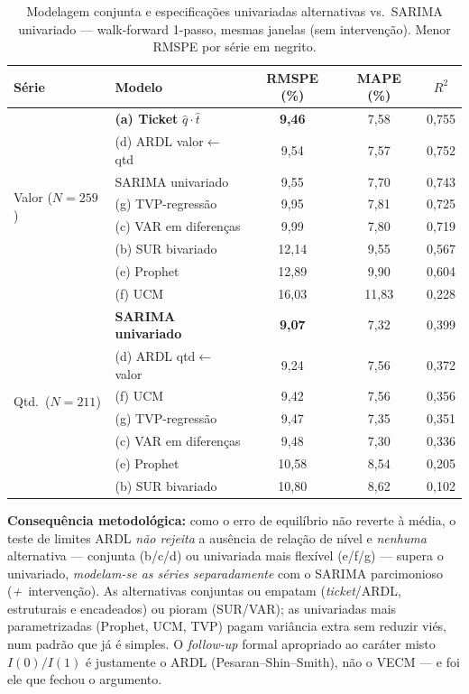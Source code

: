 \documentclass[11pt,a4paper]{article}
\begin{document}
\begin{table}[H]
\centering
\caption{Modelagem conjunta e especificações univariadas alternativas vs.\ SARIMA univariado ---
walk-forward 1-passo, mesmas janelas (sem intervenção). Menor RMSPE por série em negrito.}
\label{tab:joint}
\small
\begin{tabular}{@{}llccc@{}}
\toprule
Série & Modelo & RMSPE (\%) & MAPE (\%) & $R^2$ \\
\midrule
\multirow{8}{*}{Valor ($N{=}259$)}
 & \textbf{(a) Ticket} $\hat q\cdot\hat t$ & \textbf{9,46}  & 7,58 & 0,755 \\
 & (d) ARDL valor$\leftarrow$qtd            & 9,54           & 7,57 & 0,752 \\
 & SARIMA univariado                        & 9,55           & 7,70 & 0,743 \\
 & (g) TVP-regressão                        & 9,95           & 7,81 & 0,725 \\
 & (c) VAR em diferenças                    & 9,99           & 7,80 & 0,719 \\
 & (b) SUR bivariado                        & 12,14          & 9,55 & 0,567 \\
 & (e) Prophet                              & 12,89          & 9,90 & 0,604 \\
 & (f) UCM                                  & 16,03          & 11,83& 0,228 \\
\midrule
\multirow{7}{*}{Qtd.\ ($N{=}211$)}
 & \textbf{SARIMA univariado}               & \textbf{9,07}  & 7,32 & 0,399 \\
 & (d) ARDL qtd$\leftarrow$valor            & 9,24           & 7,56 & 0,372 \\
 & (f) UCM                                  & 9,42           & 7,56 & 0,356 \\
 & (g) TVP-regressão                        & 9,47           & 7,35 & 0,351 \\
 & (c) VAR em diferenças                    & 9,48           & 7,30 & 0,336 \\
 & (e) Prophet                              & 10,58          & 8,54 & 0,205 \\
 & (b) SUR bivariado                        & 10,80          & 8,62 & 0,102 \\
\bottomrule
\end{tabular}
\end{table}

\noindent\textbf{Consequência metodológica:} como o erro de equilíbrio não reverte à média, o teste
de limites ARDL \emph{não rejeita} a ausência de relação de nível e \emph{nenhuma} alternativa ---
conjunta (b/c/d) ou univariada mais flexível (e/f/g) --- supera o univariado, \emph{modelam-se as
séries separadamente} com o SARIMA parcimonioso (\emph{+}\ intervenção). As alternativas conjuntas
ou empatam (\emph{ticket}/ARDL, estruturais e encadeados) ou pioram (SUR/VAR); as univariadas mais
parametrizadas (Prophet, UCM, TVP) pagam variância extra sem reduzir viés, num padrão que já é
simples. O \emph{follow-up} formal apropriado ao caráter misto $I(0)/I(1)$ é justamente o ARDL
(Pesaran--Shin--Smith), não o VECM --- e foi ele que fechou o argumento.
\end{document}
